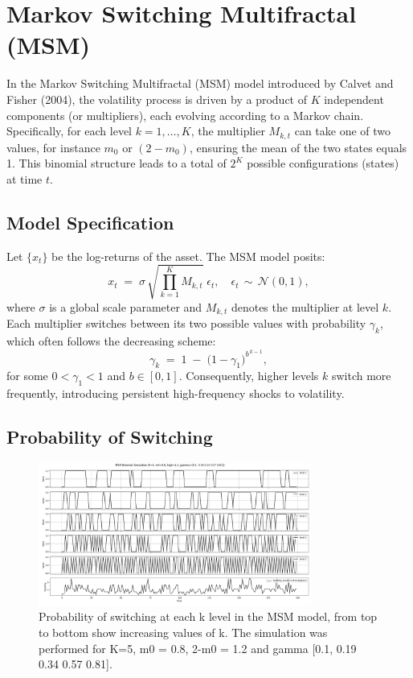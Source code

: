 \documentclass[11pt]{extarticle}
\begin{document}
\section{Markov Switching Multifractal (MSM)}
\label{sec:msm}

In the Markov Switching Multifractal (MSM) model introduced by Calvet and Fisher (2004), the volatility process is driven by a product of $K$ independent components (or multipliers), each evolving according to a Markov chain. Specifically, for each level $k = 1, \ldots, K$, the multiplier $M_{k,t}$ can take one of two values, for instance $m_0$ or $(2 - m_0)$, ensuring the mean of the two states equals 1. This binomial structure leads to a total of $2^K$ possible configurations (states) at time $t$.

\subsection{Model Specification}
Let $\{ x_t \}$ be the log-returns of the asset. The MSM model posits:
\begin{equation}
    x_t \;=\; \sigma \,\sqrt{\prod_{k=1}^K M_{k,t}} \;\epsilon_t,\quad
    \epsilon_t \,\sim\, \mathcal{N}(0,1),
\end{equation}
where $\sigma$ is a global scale parameter and $M_{k,t}$ denotes the multiplier at level $k$. Each multiplier switches between its two possible values with probability $\gamma_k$, which often follows the decreasing scheme:
\begin{equation}
    \label{eq:gamma_k}
    \gamma_k \;=\; 1 \;-\; \bigl(1 - \gamma_1\bigr)^{b^{\,k-1}},
\end{equation}
for some $0 < \gamma_1 < 1$ and $b \in  [0,1]$. Consequently, higher levels $k$ switch more frequently, introducing persistent high-frequency shocks to volatility.


\subsection{Probability of Switching}

\begin{figure}[!ht]
    \centering
    \includegraphics[width=0.8\textwidth]{img/k_analysis}
    \caption{Probability of switching at each k level in the MSM model, from top to bottom show increasing values of k.
    The simulation was performed for K=5, m0 = 0.8, 2-m0 = 1.2 and gamma [0.1, 0.19 0.34 0.57 0.81].}
    \label{fig:k_analysis}
\end{figure}
\end{document}
